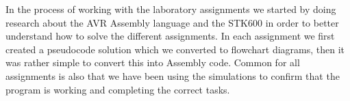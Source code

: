 In the process of working with the laboratory assignments we started by doing research about the AVR Assembly language and the STK600 in order to better understand how to solve the different assignments.
In each assignment we first created a pseudocode solution which we converted to flowchart diagrams, then it was rather simple to convert this into Assembly code. Common for all assignments is also that we have been using the simulations to confirm that the program is working and completing the correct tasks. 
